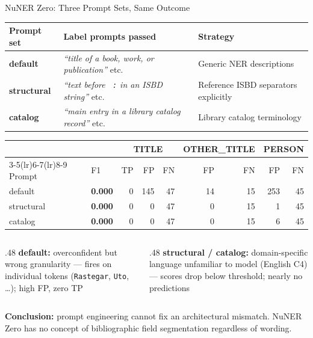 \documentclass[xcolor,aspectratio=169,compress]{beamer}
\begin{document}
\begin{frame}{NuNER Zero: Three Prompt Sets, Same Outcome}
  \small
  \begin{tabular}{llp{5cm}}
    \toprule
    Prompt set & Label prompts passed & Strategy \\
    \midrule
    \textbf{default}    & \textit{``title of a book, work, or publication''} etc.\ & Generic NER descriptions \\
    \textbf{structural} & \textit{``text before \texttt{ :} in an ISBD string''} etc.\ & Reference ISBD separators explicitly \\
    \textbf{catalog}    & \textit{``main entry in a library catalog record''} etc.\ & Library catalog terminology \\
    \bottomrule
  \end{tabular}

  \begin{tabular}{llrrrrrrr}
    \toprule
    & & \multicolumn{3}{c}{TITLE} & \multicolumn{2}{c}{OTHER\_TITLE} & \multicolumn{2}{c}{PERSON} \\
    \cmidrule(lr){3-5}\cmidrule(lr){6-7}\cmidrule(lr){8-9}
    Prompt & F1 & TP & FP & FN & FP & FN & FP & FN \\
    \midrule
    default    & \textbf{0.000} &  0 & 145 & 47 & 14 & 15 & 253 & 45 \\
    structural & \textbf{0.000} &  0 &   0 & 47 &  0 & 15 &   1 & 45 \\
    catalog    & \textbf{0.000} &  0 &   0 & 47 &  0 & 15 &   6 & 45 \\
    \bottomrule
  \end{tabular}

  \footnotesize
  \begin{columns}[t]
    \begin{column}{.48\textwidth}
      \textbf{default:} overconfident but wrong granularity ---
      fires on individual tokens (\texttt{Rastegar}, \texttt{Uto}, \ldots); high FP, zero TP
    \end{column}
    \begin{column}{.48\textwidth}
      \textbf{structural / catalog:} domain-specific language unfamiliar to model (English C4) ---
      scores drop below threshold; nearly no predictions
    \end{column}
  \end{columns}
  \smallskip
  \small\textbf{Conclusion:} prompt engineering cannot fix an architectural mismatch.
  NuNER Zero has no concept of bibliographic field segmentation regardless of wording.
\end{frame}
\end{document}
